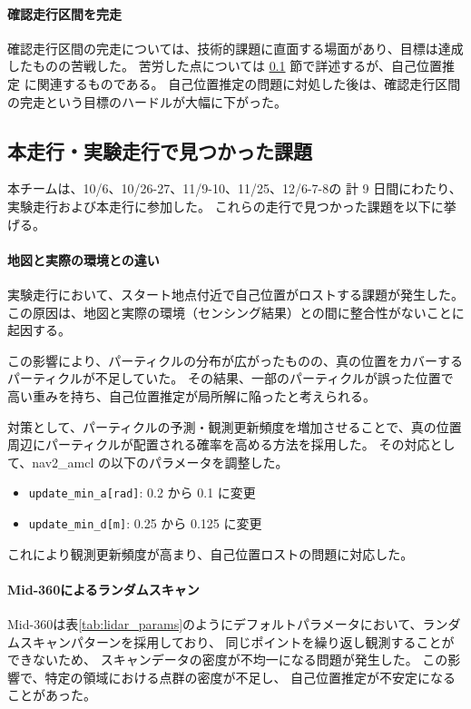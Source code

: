 \documentclass[twocolumn,9pt]{jsproceedings}
\begin{document}
\paragraph{確認走行区間を完走}
確認走行区間の完走については、技術的課題に直面する場面があり、目標は達成したものの苦戦した。
苦労した点については  \ref{sec:4} 節で詳述するが、自己位置推定 に関連するものである。
自己位置推定の問題に対処した後は、確認走行区間の完走という目標のハードルが大幅に下がった。

\subsection{本走行・実験走行で見つかった課題}\label{sec:4}

本チームは、10/6、10/26-27、11/9-10、11/25、12/6-7-8の
計 9 日間にわたり、実験走行および本走行に参加した。
これらの走行で見つかった課題を以下に挙げる。

\paragraph{地図と実際の環境との違い}
実験走行において、スタート地点付近で自己位置がロストする課題が発生した。
この原因は、地図と実際の環境（センシング結果）との間に整合性がないことに起因する。

この影響により、パーティクルの分布が広がったものの、真の位置をカバーするパーティクルが不足していた。
その結果、一部のパーティクルが誤った位置で高い重みを持ち、自己位置推定が局所解に陥ったと考えられる。

対策として、パーティクルの予測・観測更新頻度を増加させることで、真の位置周辺にパーティクルが配置される確率を高める方法を採用した。
その対応として、nav2\_amcl の以下のパラメータを調整した。

\begin{itemize}
  \item \texttt{update\_min\_a[rad]}: 0.2 から 0.1 に変更  
  \item \texttt{update\_min\_d[m]}: 0.25 から 0.125 に変更  
\end{itemize}
これにより観測更新頻度が高まり、自己位置ロストの問題に対応した。

\paragraph{Mid-360によるランダムスキャン}
Mid-360は表\ref{tab:lidar_params}のようにデフォルトパラメータ\cite{mid360param}において、ランダムスキャンパターンを採用しており、
同じポイントを繰り返し観測することができないため、
スキャンデータの密度が不均一になる問題が発生した。
この影響で、特定の領域における点群の密度が不足し、
自己位置推定が不安定になることがあった。
\end{document}

